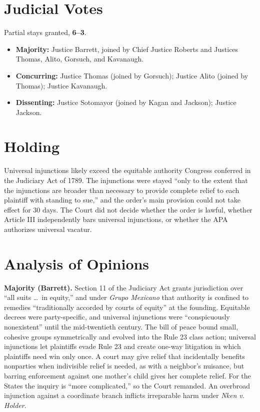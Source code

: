 \documentclass[12pt]{article}
\begin{document}
\section{Judicial Votes}

Partial stays granted, \textbf{6--3}.
\begin{itemize}
\item \textbf{Majority:} Justice Barrett, joined by Chief Justice Roberts and Justices Thomas, Alito, Gorsuch, and Kavanaugh.
\item \textbf{Concurring:} Justice Thomas (joined by Gorsuch); Justice Alito (joined by Thomas); Justice Kavanaugh.
\item \textbf{Dissenting:} Justice Sotomayor (joined by Kagan and Jackson); Justice Jackson.
\end{itemize}

\section{Holding}

Universal injunctions likely exceed the equitable authority Congress conferred in the Judiciary Act of 1789. The injunctions were stayed ``only to the extent that the injunctions are broader than necessary to provide complete relief to each plaintiff with standing to sue,'' and the order's main provision could not take effect for 30 days. The Court did not decide whether the order is lawful, whether Article III independently bars universal injunctions, or whether the APA authorizes universal vacatur.

\section{Analysis of Opinions}

\textbf{Majority (Barrett).} Section 11 of the Judiciary Act grants jurisdiction over ``all suits \ldots\ in equity,'' and under \textit{Grupo Mexicano} that authority is confined to remedies ``traditionally accorded by courts of equity'' at the founding. Equitable decrees were party-specific, and universal injunctions were ``conspicuously nonexistent'' until the mid-twentieth century. The bill of peace bound small, cohesive groups symmetrically and evolved into the Rule 23 class action; universal injunctions let plaintiffs evade Rule 23 and create one-way litigation in which plaintiffs need win only once. A court may give relief that incidentally benefits nonparties when indivisible relief is needed, as with a neighbor's nuisance, but barring enforcement against one mother's child gives her complete relief. For the States the inquiry is ``more complicated,'' so the Court remanded. An overbroad injunction against a coordinate branch inflicts irreparable harm under \textit{Nken v. Holder}.
\end{document}
